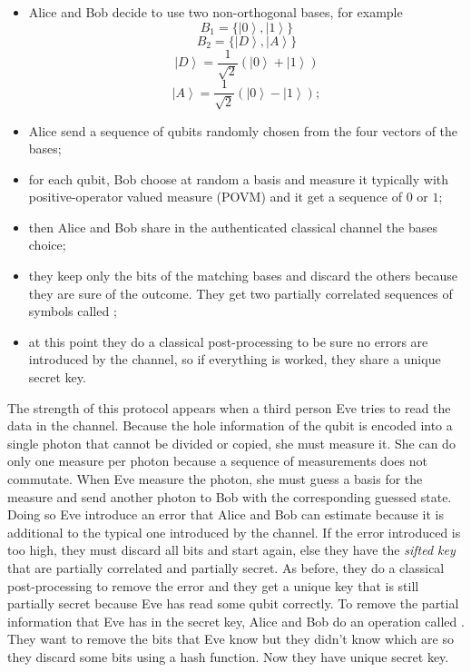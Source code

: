 \begin{itemize}
  \item Alice and Bob decide to use two non-orthogonal bases, for example
        \begin{equation}
          B_1 = \{\left|0\right>, \left|1\right>\}
        \end{equation}
        \begin{equation}
          B_2 = \{\left|D\right>, \left|A\right>\}
        \end{equation}
        \begin{equation}
          \left|D\right> = \frac{1}{\sqrt{2}} (\left|0\right> + \left|1\right>)
        \end{equation}
        \begin{equation}
          \left|A\right> = \frac{1}{\sqrt{2}} (\left|0\right> - \left|1\right>);
        \end{equation}
  \item Alice send a sequence of qubits randomly chosen from the four vectors of the bases;
  \item for each qubit, Bob choose at random a basis and measure it typically with positive-operator valued measure (POVM) and it get a sequence of $0$ or $1$;
  \item then Alice and Bob share in the authenticated classical channel the bases choice;
  \item they keep only the bits of the matching bases and discard the others because they are sure of the outcome. They get two partially correlated sequences of symbols called ;
  \item at this point they do a classical post-processing to be sure no errors are introduced by the channel, so if everything is worked, they share a unique secret key.
\end{itemize}

The strength of this protocol appears when a third person Eve tries to read the data in the channel. Because the hole information of the qubit is encoded into a single photon that cannot be divided or copied, she must measure it. She can do only one measure per photon because a sequence of measurements does not commutate. When Eve measure the photon, she must guess a basis for the measure and send another photon to Bob with the corresponding guessed state. Doing so Eve introduce an error that Alice and Bob can estimate because it is additional to the typical one introduced by the channel. If the error introduced is too high, they must discard all bits and start again, else they have the \textit{sifted key} that are partially correlated and partially secret. As before, they do a classical post-processing to remove the error and they get a unique key that is still partially secret because Eve has read some qubit correctly. To remove the partial information that Eve has in the secret key, Alice and Bob do an operation called . They want to remove the bits that Eve know but they didn't know which are so they discard some bits using a hash function. Now they have unique secret key.


